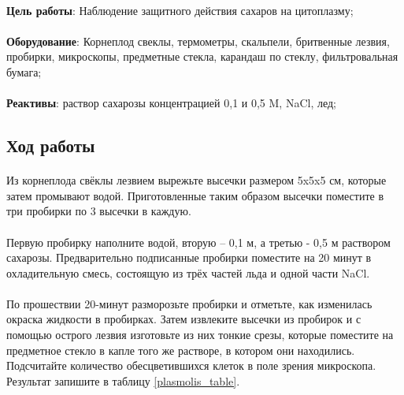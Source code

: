 
\begin{footnotesize}

\paragraph*{}\textbf{Цель работы}: Наблюдение защитного действия сахаров на цитоплазму;
\paragraph*{}\textbf{Оборудование}: Корнеплод свеклы, термометры, скальпели, бритвенные лезвия, пробирки, микроскопы, предметные стекла, карандаш по стеклу, фильтровальная бумага;

\paragraph*{}\textbf{Реактивы}: раствор сахарозы концентрацией 0,1 и 0,5 M, NaCl, лед;

\end{footnotesize}

\subsection*{Ход работы}

\paragraph*{}Из корнеплода свёклы лезвием вырежьте высечки размером 5x5x5 см, которые затем промывают водой. Приготовленные таким образом высечки поместите в три пробирки по 3 высечки в каждую.

\paragraph*{}Первую пробирку наполните водой, вторую – 0,1 м, а третью - 0,5 м раствором сахарозы. Предварительно подписанные пробирки поместите на 20 минут в охладительную смесь, состоящую из трёх частей льда и одной части NaCl.

\paragraph*{}По прошествии 20-минут разморозьте пробирки и отметьте, как изменилась окраска жидкости в пробирках. Затем извлеките высечки из пробирок и с помощью острого лезвия изготовьте из них тонкие срезы, которые поместите на предметное стекло в капле того же растворе, в котором они находились. Подсчитайте количество обесцветившихся клеток в поле зрения микроскопа. Результат запишите в таблицу \ref{plasmolis_table}.

